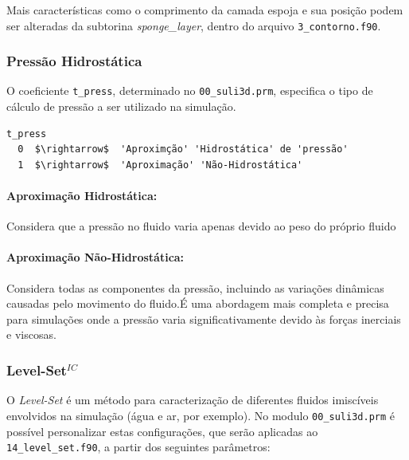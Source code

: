 \documentclass[12pt, a4paper]{article}
\begin{document}
Mais características como o comprimento da camada espoja e sua posição podem ser alteradas da subtorina \textit{sponge\_layer}, dentro do arquivo \verb|3_contorno.f90|.


	

 \subsubsection{Pressão Hidrostática}
O coeficiente \verb|t_press|, determinado no \verb|00_suli3d.prm|, especifica o tipo de cálculo de pressão a ser utilizado na simulação.

 \begin{lstlisting}[escapeinside='']
t_press
  0  $\rightarrow$  'Aproximção' 'Hidrostática' de 'pressão'
  1  $\rightarrow$  'Aproximação' 'Não-Hidrostática'
\end{lstlisting}

\paragraph{Aproximação Hidrostática:} Considera que a pressão no fluido varia apenas devido ao peso do próprio fluido
\paragraph{Aproximação Não-Hidrostática:} Considera todas as componentes da pressão, incluindo as variações dinâmicas causadas pelo movimento do fluido.É uma abordagem mais completa e precisa para simulações onde a pressão varia significativamente devido às forças inerciais e viscosas.

\subsubsection{Level-Set$^{IC}$} 
O \textit{Level-Set} é um método para caracterização de diferentes fluidos imiscíveis envolvidos na simulação (água e ar, por exemplo). No modulo \verb|00_suli3d.prm| é possível personalizar estas configurações, que serão aplicadas ao \verb|14_level_set.f90|, a partir dos seguintes parâmetros:
\end{document}
